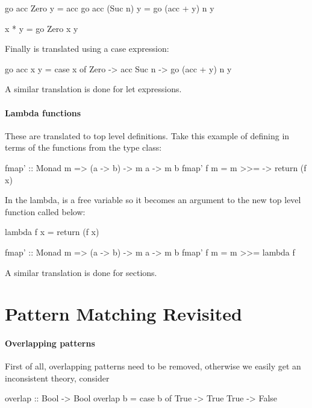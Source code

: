 \begin{code}
go acc Zero    y = acc
go acc (Suc n) y = go (acc + y) n y

x * y = go Zero x y
\end{code}

\noindent
Finally  is translated using a case expression:

\begin{code}
go acc x y = case x of
     Zero  -> acc
     Suc n -> go (acc + y) n y
\end{code}

A similar translation is done for let expressions.

\paragraph{Lambda functions} These are translated to top level
definitions. Take this example of defining  in terms of the
functions from the  type class:

\begin{code}
fmap' :: Monad m => (a -> b) -> m a -> m b
fmap' f m = m >>= \x -> return (f x)
\end{code}

\noindent
In the lambda,  is a free variable so it becomes an argument to
the new top level function called  below:

\begin{code}
lambda f x = return (f x)

fmap' :: Monad m => (a -> b) -> m a -> m b
fmap' f m = m >>= lambda f
\end{code}

A similar translation is done for sections.

\section{Pattern Matching Revisited}
\label{sec:patternsrevisited}

\paragraph{Overlapping patterns} First of all, overlapping patterns need to be removed, otherwise we
easily get an inconsistent theory, consider

\begin{code}
overlap :: Bool -> Bool
overlap b = case b of
              True -> True
              True -> False
\end{code}

